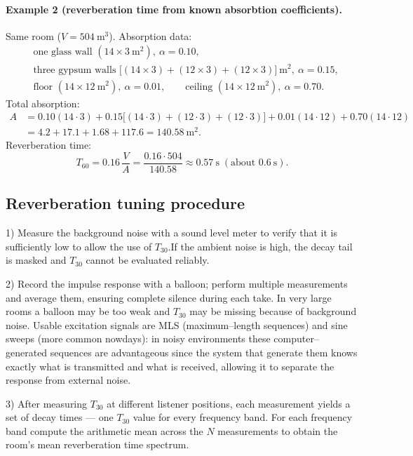 \paragraph{Example 2 (reverberation time from known absorbtion coefficients).}
Same room (\(V=504~\mathrm{m^3}\)). Absorption data:
\[
\begin{aligned}
&\text{one glass wall }(14\times3~\mathrm{m^2}),~\alpha=0.10,\\
&\text{three gypsum walls } \bigl[(14\times3)+(12\times3)+(12\times3)\bigr]~\mathrm{m^2},~\alpha=0.15,\\
&\text{floor }(14\times12~\mathrm{m^2}),~\alpha=0.01,\qquad
\text{ceiling }(14\times12~\mathrm{m^2}),~\alpha=0.70.
\end{aligned}
\]
Total absorption:
\[
\begin{aligned}
A&=0.10(14\cdot3)+0.15\bigl[(14\cdot3)+(12\cdot3)+(12\cdot3)\bigr]
      +0.01(14\cdot12)+0.70(14\cdot12)\\
 &=4.2+17.1+1.68+117.6=140.58~\mathrm{m^2}.
\end{aligned}
\]
Reverberation time:
\[
T_{60}=0.16\,\frac{V}{A}=\frac{0.16\cdot504}{140.58}
      \approx \mathbf{0.57~\mathrm{s}}\;(\text{about }0.6~\mathrm{s}).
\]

\subsection{Reverberation tuning procedure}

1) Measure the background noise with a sound level meter to verify that it is sufficiently low to allow the use of \(T_{30}\).If the ambient noise is high, the decay tail is masked and \(T_{30}\) cannot be evaluated reliably.

2) Record the impulse response with a balloon; perform multiple measurements and average them, ensuring complete silence during each take. In very large rooms a balloon may be too weak and \(T_{30}\) may be missing because of background noise. Usable excitation signals are MLS (maximum–length sequences) and sine sweeps (more common nowdays): in noisy environments these computer–generated sequences are advantageous since the system that generate them knows exactly what is transmitted and what is received, allowing it to separate the response from external noise.

3) After measuring \(T_{30}\) at different listener positions, each measurement yields a set of decay times — one \(T_{30}\) value for every frequency band. For each frequency band compute the arithmetic mean across the \(N\) measurements to obtain the room's mean reverberation time spectrum.

